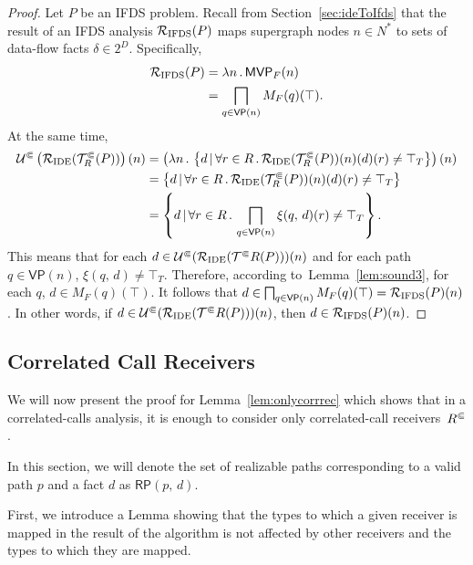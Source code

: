 \precision*
\begin{proof}
  Let $P$ be an IFDS problem. Recall from Section~\ref{sec:ideToIfds} that the result of an IFDS analysis $\mathcal R_{\text{IFDS}}(P)$ maps supergraph
  nodes $n\in N^*$ to sets of data-flow facts $\delta\in2^D$. Specifically,
  \begin{align*}
    \mathcal R_{\text{IFDS}}(P)&=\lambda n\,.\,\textsf{MVP}_{F}(n)\\
    &=\bigsqcap_{q\in\textsf{VP}(n)}M_F(q)(\top).
  \end{align*}
  At the same time,
  \begin{align*}
    \mathcal U^\Subset\left(\mathcal R_{\text{IDE}}(\mathcal T^\Subset_R(P))\right)(n)
    &=\left(\lambda n\,.\,\left\{d\,|\,\forall r\in R\,.\,\mathcal R_{\text{IDE}}(\mathcal T^\Subset_R(P))(n)(d)(r)\ne\top_T\right\}\right)(n)\\
    &=\left\{d\,|\,\forall r\in R\,.\,\mathcal R_{\text{IDE}}(\mathcal T^\Subset_R(P))(n)(d)(r)\ne\top_T\right\}\\
    &=\left\{d\,|\,\forall r\in R\,.\,\bigsqcap_{q\in\textsf{VP}(n)}\xi(q,\,d)(r)\ne\top_T\right\}.
  \end{align*}
  This means that for each $d\in\mathcal U^\Subset(\mathcal R_{\text{IDE}}(\mathcal T^\Subset R(P)))(n)$ and for each path $q\in\textsf{VP}(n)$, $\xi(q,\,d)\ne\top_T$. Therefore, according to~Lemma~\ref{lem:sound3}, for each $q$, $d\in M_F(q)(\top)$. It follows that $d\in\bigsqcap_{q\in\textsf{VP}(n)}M_F(q)(\top)=\mathcal R_{\text{IFDS}}(P)(n)$. 
  In other words, if $d\in\mathcal U^\Subset(\mathcal R_{\text{IDE}}(\mathcal T^\Subset R(P)))(n)$, then $d\in\mathcal R_{\text{IFDS}}(P)(n)$.
\end{proof}

\subsection*{Correlated Call Receivers}
We will now present the proof for Lemma~\ref{lem:onlycorrrec} which shows that in a correlated-calls analysis, it is enough to consider only correlated-call receivers~${R^\Subset}$.

In this section, we will denote the set of realizable paths corresponding to a valid path $p$ and a fact $d$ as $\textsf{RP}(p,\,d)$.

First, we introduce a Lemma showing that the types to which a given receiver is mapped in the result of the algorithm is not affected by other receivers and the types to which they are mapped.

